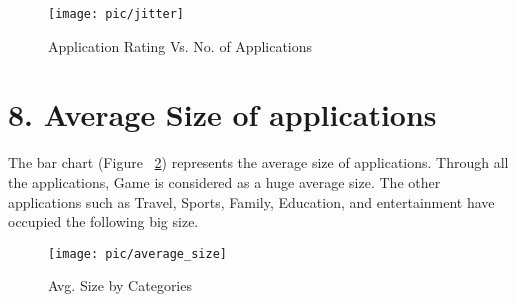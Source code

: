 \begin{figure}
\centering
\texttt{[image: pic/jitter]}
\caption{Application Rating Vs. No. of Applications} 
\label{fig:8}
\end{figure}

\section*{8. Average Size of applications}
The bar chart (Figure ~\ref{fig:9}) represents the average size of applications. Through all the applications, Game is considered as a huge average size. The other applications such as Travel, Sports, Family, Education, and entertainment have occupied the following big size.
\begin{figure}
\centering
\texttt{[image: pic/average\_size]}
\caption{Avg. Size by Categories} 
\label{fig:9}
\end{figure}




